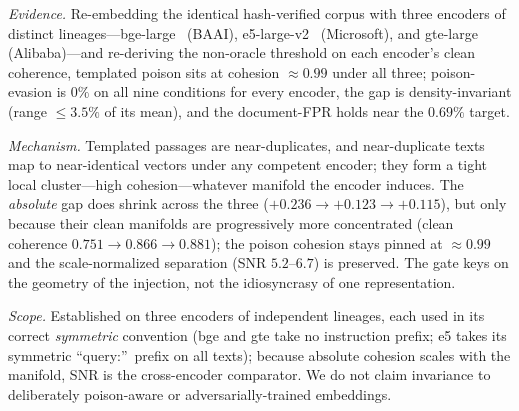 \documentclass[10pt,journal,compsoc]{IEEEtran}
\begin{document}
\emph{Evidence.} Re-embedding the identical hash-verified corpus with three encoders of
distinct lineages---bge-large~\cite{bge} (BAAI), e5-large-v2~\cite{e5} (Microsoft), and
gte-large~\cite{gte} (Alibaba)---and re-deriving the non-oracle threshold on each
encoder's clean coherence, templated poison sits at cohesion $\approx 0.99$ under all
three; poison-evasion is $0\%$ on all nine conditions for every encoder, the gap is
density-invariant (range $\le 3.5\%$ of its mean), and the document-FPR holds near the
$0.69\%$ target.

\emph{Mechanism.} Templated passages are near-duplicates, and near-duplicate texts map
to near-identical vectors under any competent encoder; they form a tight local
cluster---high cohesion---whatever manifold the encoder induces. The \emph{absolute}
gap does shrink across the three ($+0.236 \to +0.123 \to +0.115$), but only because
their clean manifolds are progressively more concentrated (clean coherence
$0.751 \to 0.866 \to 0.881$); the poison cohesion stays pinned at $\approx 0.99$ and
the scale-normalized separation (SNR $5.2$--$6.7$) is preserved. The gate keys on the
geometry of the injection, not the idiosyncrasy of one representation.

\emph{Scope.} Established on three encoders of independent lineages, each used in its
correct \emph{symmetric} convention (bge and gte take no instruction prefix; e5 takes
its symmetric ``query:''\ prefix on all texts); because absolute cohesion scales with
the manifold, SNR is the cross-encoder comparator. We do not claim invariance to
deliberately poison-aware or adversarially-trained embeddings.
\end{document}
